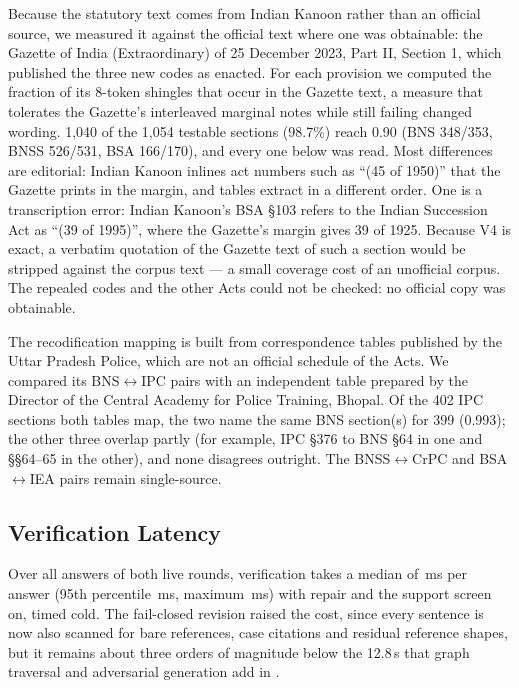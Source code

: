 \documentclass[conference]{IEEEtran}
\begin{document}
Because the statutory text comes from Indian Kanoon rather than an official source, we measured it against the official text where one was obtainable: the Gazette of India (Extraordinary) of 25 December 2023, Part II, Section 1, which published the three new codes as enacted. For each provision we computed the fraction of its 8-token shingles that occur in the Gazette text, a measure that tolerates the Gazette's interleaved marginal notes while still failing changed wording. 1,040 of the 1,054 testable sections (98.7\%) reach 0.90 (BNS 348/353, BNSS 526/531, BSA 166/170), and every one below was read. Most differences are editorial: Indian Kanoon inlines act numbers such as ``(45 of 1950)'' that the Gazette prints in the margin, and tables extract in a different order. One is a transcription error: Indian Kanoon's BSA \S103 refers to the Indian Succession Act as ``(39 of 1995)'', where the Gazette's margin gives 39 of 1925. Because V4 is exact, a verbatim quotation of the Gazette text of such a section would be stripped against the corpus text --- a small coverage cost of an unofficial corpus. The repealed codes and the other Acts could not be checked: no official copy was obtainable.

The recodification mapping is built from correspondence tables published by the Uttar Pradesh Police, which are not an official schedule of the Acts. We compared its BNS$\leftrightarrow$IPC pairs with an independent table prepared by the Director of the Central Academy for Police Training, Bhopal. Of the 402 IPC sections both tables map, the two name the same BNS section(s) for 399 (0.993); the other three overlap partly (for example, IPC \S376 to BNS \S64 in one and \S\S64--65 in the other), and none disagrees outright. The BNSS$\leftrightarrow$CrPC and BSA$\leftrightarrow$IEA pairs remain single-source.

\subsection{Verification Latency}
\label{ssec:latency}

Over all \LatencyN{} answers of both live rounds, verification takes a median of \LatencyMedian\,ms per answer (95th percentile \LatencyPninetyfive\,ms, maximum \LatencyMax\,ms) with repair and the support screen on, timed cold. The fail-closed revision raised the cost, since every sentence is now also scanned for bare references, case citations and residual reference shapes, but it remains about three orders of magnitude below the 12.8\,s that graph traversal and adversarial generation add in \cite{bindra2026}.
\end{document}
